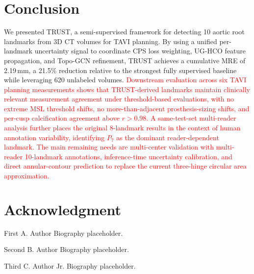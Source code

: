 \documentclass[conference]{IEEEtran}
\begin{document}
\section{Conclusion}
\label{sec:conclusion}

We presented TRUST, a semi-supervised framework for detecting 10 aortic root landmarks from 3D CT volumes for TAVI planning. By using a unified per-landmark uncertainty signal to coordinate CPS loss weighting, UG-HCO feature propagation, and Topo-GCN refinement, TRUST achieves a cumulative MRE of 2.19\,mm, a 21.5\% reduction relative to the strongest fully supervised baseline while leveraging 620 unlabeled volumes. \textcolor{red}{Downstream evaluation across six TAVI planning measurements shows that TRUST-derived landmarks maintain clinically relevant measurement agreement under threshold-based evaluations, with no extreme MSL threshold shifts, no more-than-adjacent prosthesis-sizing shifts, and per-cusp calcification agreement above $r > 0.98$.} \textcolor{red}{A same-test-set multi-reader analysis further places the original 8-landmark results in the context of human annotation variability, identifying $P_7$ as the dominant reader-dependent landmark. The main remaining needs are multi-center validation with multi-reader 10-landmark annotations, inference-time uncertainty calibration, and direct annular-contour prediction to replace the current three-hinge circular area approximation.}

\section*{Acknowledgment}




\begin{IEEEbiographynophoto}{First A. Author}
Biography placeholder.
\end{IEEEbiographynophoto}

\begin{IEEEbiographynophoto}{Second B. Author}
Biography placeholder.
\end{IEEEbiographynophoto}

\begin{IEEEbiographynophoto}{Third C. Author Jr.}
Biography placeholder.
\end{IEEEbiographynophoto}
\end{document}
